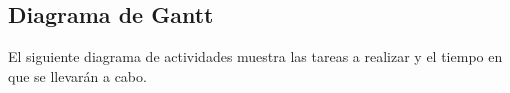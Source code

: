 %

\subsection{Diagrama de Gantt}

El siguiente diagrama de actividades muestra las tareas a realizar y el tiempo 
en que se llevarán a cabo.



